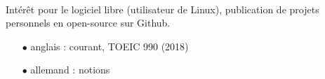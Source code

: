 \documentclass{cv}
\begin{document}
\paragraph{} Intérêt pour le logiciel libre (utilisateur de Linux), publication de projets personnels en open-source sur Github.



\begin{itemize}
\setlength\itemsep{0pt}
\item[$\bullet$] anglais : courant, TOEIC 990 (2018)
\item[$\bullet$] allemand : notions
\end{itemize}



\end{document}
